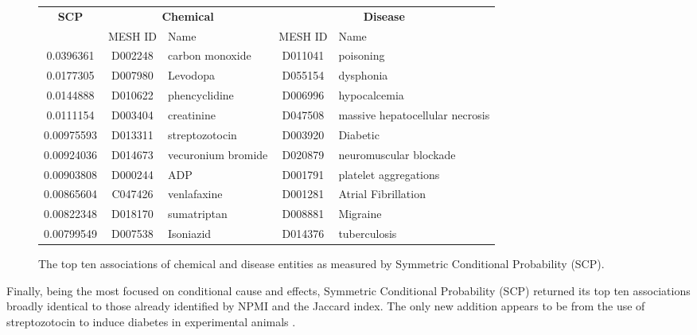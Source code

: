 \documentclass[10pt, oneside]{article}
\begin{document}
\begin{figure}[h]
\begin{center}
\fontsize{9}{11}\selectfont
\begin{tabular}{|*{2}{c|}p{4.5cm}|c|p{4.5cm}|}\hline
 \multirow{2}{*}{\textbf{SCP}} & \multicolumn{2}{c|}{\textbf{Chemical}} & \multicolumn{2}{c|}{\textbf{Disease}} \\ \cline{2-5}
 & MESH ID   & Name                      & MESH ID   & Name                         \\ \hline
 0.0396361  & D002248   & carbon monoxide    & D011041   & poisoning                       \\ \hline
 0.0177305  & D007980   & Levodopa           & D055154   & dysphonia                       \\ \hline
 0.0144888  & D010622   & phencyclidine      & D006996   & hypocalcemia                    \\ \hline
 0.0111154  & D003404   & creatinine         & D047508   & massive hepatocellular necrosis \\ \hline
 0.00975593 & D013311   & streptozotocin     & D003920   & Diabetic                        \\ \hline
 0.00924036 & D014673   & vecuronium bromide & D020879   & neuromuscular blockade          \\ \hline
 0.00903808 & D000244   & ADP                & D001791   & platelet aggregations           \\ \hline
 0.00865604 & C047426   & venlafaxine        & D001281   & Atrial Fibrillation             \\ \hline
 0.00822348 & D018170   & sumatriptan        & D008881   & Migraine                        \\ \hline
 0.00799549 & D007538   & Isoniazid          & D014376   & tuberculosis                    \\ \hline
\end{tabular}
\caption{\label{fig:scp} The top ten associations of chemical and disease entities as measured by Symmetric Conditional Probability (SCP).}
\end{center}
\end{figure}

Finally, being the most focused on conditional cause and effects, Symmetric Conditional Probability (SCP) returned its top ten associations broadly identical to those already identified by NPMI and the Jaccard index. The only new addition appears to be from the use of streptozotocin to induce diabetes in experimental animals \cite{rossini1977studies}. 
\end{document}
